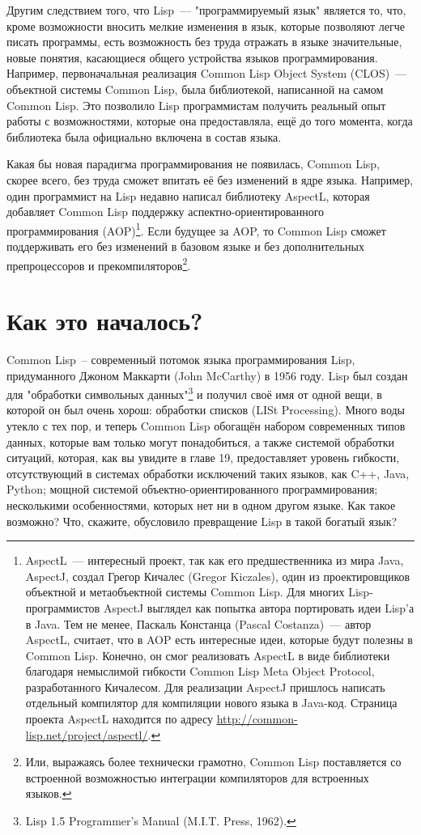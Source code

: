 Другим следствием того, что Lisp~--- "программируемый язык" является то, что, кроме
возможности вносить мелкие изменения в язык, которые позволяют легче писать программы,
есть возможность без труда отражать в языке значительные, новые понятия, касающиеся общего
устройства языков программирования. Например, первоначальная реализация Common Lisp Object
System (CLOS)~--- объектной системы Common Lisp, была библиотекой, написанной на самом
Common Lisp. Это позволило Lisp программистам получить реальный опыт работы с
возможностями, которые она предоставляла, ещё до того момента, когда библиотека была
официально включена в состав языка.

Какая бы новая парадигма программирования не появилась, Common Lisp, скорее всего, без
труда сможет впитать её без изменений в ядре языка. Например, один программист на Lisp
недавно написал библиотеку AspectL, которая добавляет Common Lisp поддержку
аспектно-ориентированного программирования (AOP)\footnote{AspectL~--- интересный проект,
  так как его предшественника из мира Java, AspectJ, создал Грегор Кичалес (Gregor
  Kiczales), один из проектировщиков объектной и метаобъектной системы Common Lisp. Для
  многих Lisp-программистов AspectJ выглядел как попытка автора портировать идеи Lisp'а в
  Java. Тем не менее, Паскаль Констанца (Pascal Costanza)~--- автор AspectL, считает, что
  в AOP есть интересные идеи, которые будут полезны в Common Lisp. Конечно, он смог
  реализовать AspectL в виде библиотеки благодаря немыслимой гибкости Common Lisp Meta
  Object Protocol, разработанного Кичалесом. Для реализации AspectJ пришлось написать
  отдельный компилятор для компиляции нового языка в Java-код. Страница проекта AspectL
  находится по адресу \url{http://common-lisp.net/project/aspectl/}.}. Если будущее за
AOP, то Common Lisp сможет поддерживать его без изменений в базовом языке и без
дополнительных препроцессоров и прекомпиляторов\footnote{Или, выражаясь более технически
  грамотно, Common Lisp поставляется со встроенной возможностью интеграции компиляторов
  для встроенных языков.}.

\section{Как это началось?}

Common Lisp~-- современный потомок языка программирования Lisp, придуманного Джоном
Маккарти (John McCarthy) в 1956 году. Lisp был создан для "обработки символьных
данных"\footnote{Lisp 1.5 Programmer's Manual (M.I.T. Press, 1962).} и получил своё имя от
одной вещи, в которой он был очень хорош: обработки списков (LISt Processing). Много воды
утекло с тех пор, и теперь Common Lisp обогащён набором современных типов данных, которые
вам только могут понадобиться, а также системой обработки ситуаций, которая, как вы
увидите в главе 19, предоставляет уровень гибкости, отсутствующий в системах обработки
исключений таких языков, как C++, Java, Python; мощной системой объектно-ориентированного
программирования; несколькими особенностями, которых нет ни в одном другом языке. Как
такое возможно? Что, скажите, обусловило превращение Lisp в такой богатый язык?

